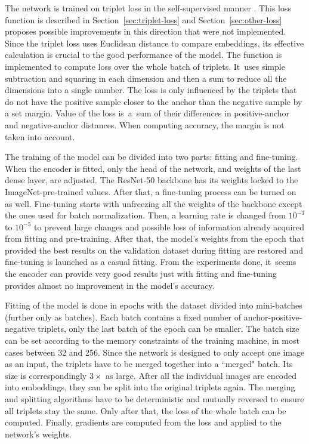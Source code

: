 The network is trained on triplet loss in the self-supervised manner \cite{facenet-triplet-loss}. This loss function is described in Section~\ref{sec:triplet-loss} and Section~\ref{sec:other-loss} proposes possible improvements in this direction that were not implemented. Since the triplet loss uses Euclidean distance to compare embeddings, its effective calculation is crucial to the good performance of the model. The function is implemented to compute loss over the whole batch of triplets. It~uses simple subtraction and squaring in each dimension and then a sum to reduce all the dimensions into a single number. The loss is only influenced by the triplets that do not have the positive sample closer to the anchor than the negative sample by a set margin. Value of the loss is~a~sum of their differences in positive-anchor and negative-anchor distances. When computing accuracy, the margin is not taken into account.

The training of the model can be divided into two parts: fitting and fine-tuning. When the encoder is fitted, only the head of the network, and weights of the last dense layer, are adjusted. The ResNet-50 backbone has its weights locked to the ImageNet-pre-trained values. After that, a fine-tuning process can be turned on as well. Fine-tuning starts with unfreezing all the weights of the backbone except the ones used for batch normalization. Then, a learning rate is changed from $10^{-3}$ to $10^{-5}$ to prevent large changes and possible loss of information already acquired from fitting and pre-training. After that, the model's weights from the epoch that provided the best results on the validation dataset during fitting are restored and fine-tuning is launched as a casual fitting. From the experiments done, it~seems the encoder can provide very good results just with fitting and fine-tuning provides almost no improvement in the model's accuracy.

Fitting of the model is done in epochs with the dataset divided into mini-batches (further only as batches). Each batch contains a fixed number of anchor-positive-negative triplets, only the last batch of the epoch can be smaller. The batch size can be set according to the memory constraints of the training machine, in most cases between 32 and 256. Since the network is designed to only accept one image as an input, the triplets have to be merged together into a ``merged" batch. Its size is correspondingly $3 \times$ as large. After all the individual images are encoded into embeddings, they can be split into the original triplets again. The merging and splitting algorithms have to be deterministic and mutually reversed to ensure all triplets stay the same. Only after that, the loss of the whole batch can be computed. Finally, gradients are computed from the loss and applied to the network's weights.

